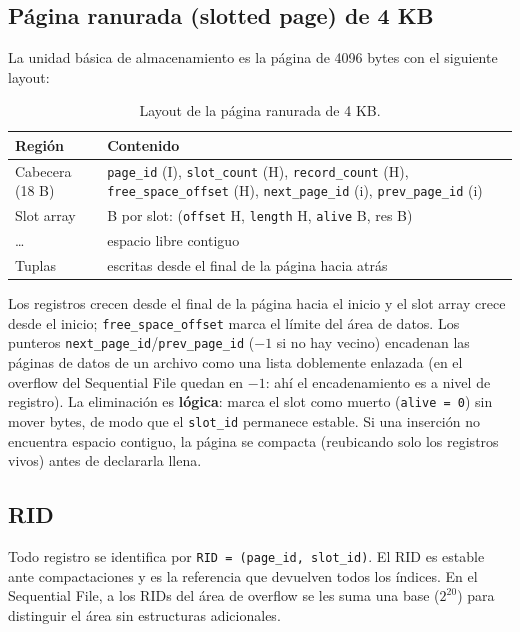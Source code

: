 \documentclass[11pt]{article}
\begin{document}
\subsection{Página ranurada (slotted page) de 4 KB}

La unidad básica de almacenamiento es la página de 4096 bytes con el
siguiente layout:

\begin{table}[!htb]
\centering
\caption{Layout de la página ranurada de 4 KB.}
\label{tab:slotted}
\small
\begin{tabular}{@{}l>{\raggedright\arraybackslash}p{10.6cm}@{}}
\toprule
\rowcolor{utecblue!10}\textbf{Región} & \textbf{Contenido} \\
\midrule
Cabecera (18 B) & \texttt{page\_id} (I), \texttt{slot\_count} (H),
  \texttt{record\_count} (H), \texttt{free\_space\_offset} (H),
  \texttt{next\_page\_id} (i), \texttt{prev\_page\_id} (i) \\
Slot array & 6 B por slot: (\texttt{offset} H, \texttt{length} H, \texttt{alive} B, res B) \\
\ldots & espacio libre contiguo \\
Tuplas & escritas desde el final de la página hacia atrás \\
\bottomrule
\end{tabular}
\end{table}

Los registros crecen desde el final de la página hacia el inicio y el slot
array crece desde el inicio; \texttt{free\_space\_offset} marca el límite
del área de datos. Los punteros \texttt{next\_page\_id}/\texttt{prev\_page\_id}
($-1$ si no hay vecino) encadenan las páginas de datos de un archivo como
una lista doblemente enlazada (en el overflow del Sequential File quedan
en $-1$: ahí el encadenamiento es a nivel de registro). La eliminación es
\textbf{lógica}: marca el slot como muerto
(\texttt{alive = 0}) sin mover bytes, de modo que el \texttt{slot\_id}
permanece estable. Si una inserción no encuentra espacio contiguo, la página
se compacta (reubicando solo los registros vivos) antes de declararla llena.

\subsection{RID}

Todo registro se identifica por \texttt{RID = (page\_id, slot\_id)}. El RID
es estable ante compactaciones y es la referencia que devuelven todos los
índices. En el Sequential File, a los RIDs del área de overflow se les suma
una base ($2^{20}$) para distinguir el área sin estructuras adicionales.
\end{document}
